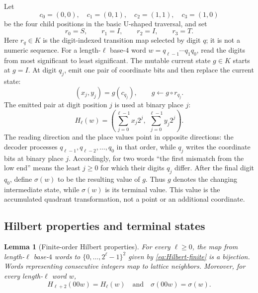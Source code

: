 \documentclass[11pt]{article}
\newtheorem{lemma}[theorem]{Lemma}
\theoremstyle{definition}
\theoremstyle{remark}
\begin{document}
Let
\[
 c_0=(0,0),\quad c_1=(0,1),\quad c_2=(1,1),\quad c_3=(1,0)
\]
be the four child positions in the basic U-shaped traversal, and set
\[
 r_0=S,\qquad r_1=I,\qquad r_2=I,\qquad r_3=T.
\]
Here $r_q\in K$ is the digit-indexed transition map selected by digit $q$;
it is not a numeric sequence.
For a length-$\ell$ base-$4$ word
$w=q_{\ell-1}\cdots q_1q_0$, read the digits from most significant to least
significant.  The mutable current state $g\in K$ starts at $g=I$.  At digit
$q_j$, emit one pair of coordinate bits and then replace the current state:
\[
 (x_j,y_j)=g(c_{q_j}),\qquad g\longleftarrow g\circ r_{q_j}.
\]
The emitted pair at digit position $j$ is used at binary place $j$:
\begin{equation}\label{eq:Hilbert-finite}
 H_\ell(w)=
 \left(\sum_{j=0}^{\ell-1}x_j2^j,\;
       \sum_{j=0}^{\ell-1}y_j2^j\right).
\end{equation}
The reading direction and the place values point in opposite directions:
the decoder processes $q_{\ell-1},q_{\ell-2},\ldots,q_0$ in that order, while
$q_j$ writes the coordinate bits at binary place $j$.  Accordingly, for two
words ``the first mismatch from the low end'' means the least $j\geq0$ for
which their digits $q_j$ differ.
After the final digit $q_0$, define $\sigma(w)$ to be the resulting value of
$g$.  Thus $g$ denotes the changing intermediate state, while $\sigma(w)$ is
its terminal value.  This value is the accumulated quadrant transformation,
not a point or an additional coordinate.

\subsection{Hilbert properties and terminal states}

\begin{lemma}[Finite-order Hilbert properties]\label{lem:finite-hilbert}
For every $\ell\geq0$, the map from length-$\ell$ base-$4$ words to
$\{0,\ldots,2^\ell-1\}^2$ given by \eqref{eq:Hilbert-finite} is a bijection.
Words representing consecutive integers map to lattice neighbors.  Moreover,
for every length-$\ell$ word $w$,
\[
 H_{\ell+2}(00w)=H_\ell(w)
 \quad\text{and}\quad
 \sigma(00w)=\sigma(w).
\]
\end{lemma}
\end{document}
